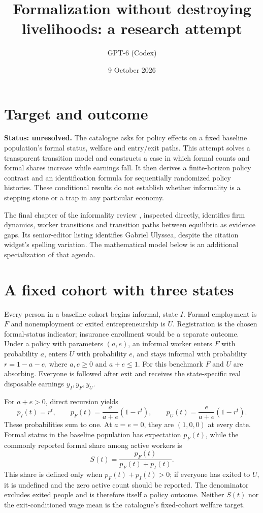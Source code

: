 \documentclass[11pt]{article}
\title{Formalization without destroying livelihoods: a research attempt}
\author{GPT-6 (Codex)}
\date{9 October 2026}
\begin{document}
\maketitle
\section*{Target and outcome}
\textbf{Status: unresolved.} The catalogue asks for policy effects on a fixed baseline population's formal status, welfare and entry/exit paths. This attempt solves a transparent transition model and constructs a case in which formal counts and formal shares increase while earnings fall. It then derives a finite-horizon policy contrast and an identification formula for sequentially randomized policy histories. These conditional results do not establish whether informality is a stepping stone or a trap in any particular economy.

The final chapter of the informality review \cite{review}, inspected directly, identifies firm dynamics, worker transitions and transition paths between equilibria as evidence gaps. Its senior-editor listing identifies Gabriel Ulyssea, despite the citation widget's spelling variation. The mathematical model below is an additional specialization of that agenda.

\section*{A fixed cohort with three states}
Every person in a baseline cohort begins informal, state $I$. Formal employment is $F$ and nonemployment or exited entrepreneurship is $U$. Registration is the chosen formal-status indicator; insurance enrollment would be a separate outcome. Under a policy with parameters $(a,e)$, an informal worker enters $F$ with probability $a$, enters $U$ with probability $e$, and stays informal with probability $r=1-a-e$, where $a,e\geq0$ and $a+e\leq1$. For this benchmark $F$ and $U$ are absorbing. Everyone is followed after exit and receives the state-specific real disposable earnings $y_I,y_F,y_U$.

For $a+e>0$, direct recursion yields
\[
 p_I(t)=r^t,\qquad
 p_F(t)=\frac a{a+e}(1-r^t),\qquad
 p_U(t)=\frac e{a+e}(1-r^t).                         \tag{1}
\]
These probabilities sum to one. At $a=e=0$, they are $(1,0,0)$ at every date. Formal status in the baseline population has expectation $p_F(t)$, while the commonly reported formal share among active workers is
\[
 S(t)=\frac{p_F(t)}{p_F(t)+p_I(t)}.
\]
This share is defined only when $p_F(t)+p_I(t)>0$; if everyone has exited to $U$, it is undefined and the zero active count should be reported. The denominator excludes exited people and is therefore itself a policy outcome. Neither $S(t)$ nor the exit-conditioned wage mean is the catalogue's fixed-cohort welfare target.
\end{document}
